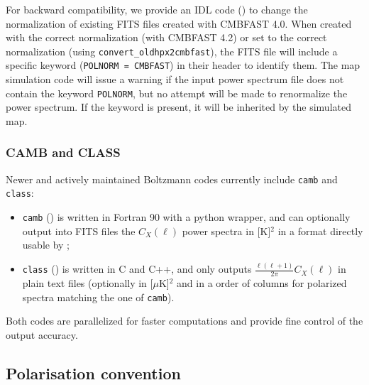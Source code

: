 \documentclass[12pt,twoside]{article}
\begin{document}
For backward compatibility, we provide an IDL code 
() 
to change the normalization of existing FITS files created with CMBFAST 4.0. 
When created with the correct normalization (with CMBFAST 4.2)
or set to the correct normalization (using \texttt{convert\_oldhpx2cmbfast}), the FITS file will include a
specific keyword (\texttt{POLNORM = CMBFAST}) in their header to identify them.
The map simulation code 
will issue a warning if the input power
spectrum file does not contain the keyword \texttt{POLNORM}, but no attempt will
be made to renormalize the power spectrum. If the keyword is present, it will be
inherited by the simulated map.


\subsubsection{CAMB and CLASS}
Newer and actively maintained Boltzmann codes currently include 
\texttt{camb} and \texttt{class}:
\begin{itemize}
\item \texttt{camb} () 
is written in Fortran 90 with a python wrapper, and can optionally output into FITS files 
the $C_X(\ell)$ power spectra in [K]$^2$ in a format directly usable by \healpixns;\\
\item \texttt{class} () 
is written in C and C++, and only outputs $\frac{\ell(\ell+1)}{2\pi}C_X(\ell)$ in plain text files 
(optionally in [$\mu$K]$^2$ and in a order of columns for polarized spectra matching the one of \texttt{camb}).
\end{itemize}
Both codes are parallelized for faster computations and provide fine control of the output accuracy.

\subsection{Polarisation convention}
\label{subsec:pol}
\newcommand{\Cl}[1]{C_{\ell}^\mathrm{#1}}
\newcommand{\Chl}[1]{C_{\ell}^\mathrm{#1}}
\newcommand{\Czl}[1]{C_\mathrm{#1},\ell}
\newcommand{\alm}[1]{a_{\ell m}^\mathrm{#1}}
\newcommand{\azlm}[1]{a_\mathrm{#1},\ell m}
\newcommand{\pushup}{\rule[.3cm]{0cm}{.2cm}}
\newcommand{\pushdn}{\rule[-.3cm]{0cm}{.2cm}}
\newcommand{\push}{\pushup\pushdn}
\newcommand{\vecn}{\textbf{n}}
\newcommand{\veceo}{\textbf{e}_{1}}
\newcommand{\vecet}{\textbf{e}_{2}}
\newcommand{\vectheta}{\textbf{e}_\theta}
\newcommand{\vecphi}{\textbf{e}_\phi}
\newcommand{\mattwo}[2]
{{
\left( 
\begin{array}{c} #1 \push \\#2 \push \end{array}
\right) 
}}
\end{document}
